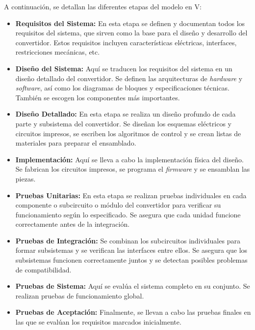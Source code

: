 A continuación, se detallan las diferentes etapas del modelo en V:

\begin{itemize}
	\item \textbf{Requisitos del Sistema:} En esta etapa se definen y documentan todos los requisitos del sistema, que sirven como la base para el diseño y desarrollo del convertidor. Estos requisitos incluyen características eléctricas, interfaces, restricciones mecánicas, etc.
	
	\item \textbf{Diseño del Sistema:} Aquí se traducen los requisitos del sistema en un diseño detallado del convertidor. Se definen las arquitecturas de \textit{hardware} y \textit{software}, así como los diagramas de bloques y especificaciones técnicas. También se escogen los componentes más importantes.
	
	\item \textbf{Diseño Detallado:} En esta etapa se realiza un diseño profundo de cada parte y subsistema del convertidor. Se diseñan los esquemas eléctricos y circuitos impresos, se escriben los algoritmos de control y se crean listas de materiales para preparar el ensamblado.
	
	\item \textbf{Implementación:} Aquí se lleva a cabo la implementación física del diseño. Se fabrican los circuitos impresos, se programa el \textit{firmware} y se ensamblan las piezas.
	
	\item \textbf{Pruebas Unitarias:} En esta etapa se realizan pruebas individuales en cada componente o subcircuito o módulo del convertidor para verificar su funcionamiento según lo especificado. Se asegura que cada unidad funcione correctamente antes de la integración.
	
	\item \textbf{Pruebas de Integración:} Se combinan los subcircuitos individuales para formar subsistemas y se verifican las interfaces entre ellos. Se asegura que los subsistemas funcionen correctamente juntos y se detectan posibles problemas de compatibilidad.
	
	\item \textbf{Pruebas de Sistema:} Aquí se evalúa el sistema completo en su conjunto. Se realizan pruebas de funcionamiento global.
	
	\item \textbf{Pruebas de Aceptación:} Finalmente, se llevan a cabo las pruebas finales en las que se evalúan los requisitos marcados inicialmente.
\end{itemize}

